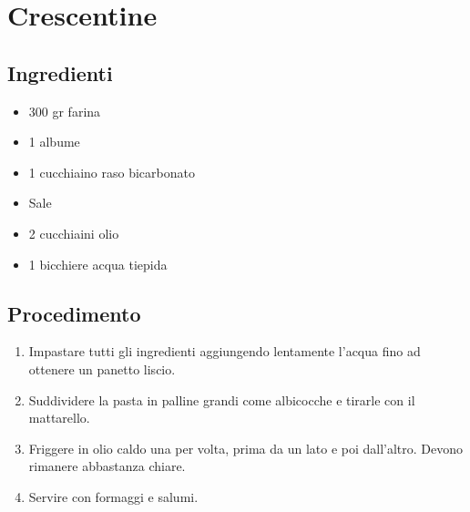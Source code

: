 \section{Crescentine}
\subsection{Ingredienti}
\begin{itemize}
\item 300 gr farina  
\item 1 albume  
\item 1 cucchiaino raso bicarbonato  
\item Sale   
\item 2 cucchiaini olio  
\item 1 bicchiere acqua tiepida
\end{itemize}
\subsection{Procedimento}
\begin{enumerate}
\item  Impastare tutti gli ingredienti aggiungendo lentamente l'acqua fino ad ottenere un panetto liscio.  
\item  Suddividere la pasta in palline grandi come albicocche e tirarle con il mattarello.  
\item  Friggere in olio caldo una per volta, prima da un lato e poi dall'altro. Devono rimanere abbastanza chiare.  
\item  Servire con formaggi e salumi.
\end{enumerate}
